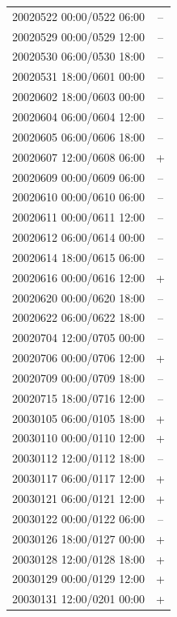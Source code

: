 \documentclass[draft]{agujournal2019}
\begin{document}
\begin{center}
\begin{longtable}{lc}
20020522 00:00/0522 06:00 & -- \\
20020529 00:00/0529 12:00 & -- \\
20020530 06:00/0530 18:00 & -- \\
20020531 18:00/0601 00:00 & -- \\
20020602 18:00/0603 00:00 & -- \\
20020604 06:00/0604 12:00 & -- \\
20020605 06:00/0606 18:00 & -- \\
20020607 12:00/0608 06:00 & + \\
20020609 00:00/0609 06:00 & -- \\
20020610 00:00/0610 06:00 & -- \\
20020611 00:00/0611 12:00 & -- \\
20020612 06:00/0614 00:00 & -- \\
20020614 18:00/0615 06:00 & -- \\
20020616 00:00/0616 12:00 & + \\
20020620 00:00/0620 18:00 & -- \\
20020622 06:00/0622 18:00 & -- \\
20020704 12:00/0705 00:00 & -- \\
20020706 00:00/0706 12:00 & + \\
20020709 00:00/0709 18:00 & -- \\
20020715 18:00/0716 12:00 & -- \\
20030105 06:00/0105 18:00 & + \\
20030110 00:00/0110 12:00 & + \\
20030112 12:00/0112 18:00 & -- \\
20030117 06:00/0117 12:00 & + \\
20030121 06:00/0121 12:00 & + \\
20030122 00:00/0122 06:00 & -- \\
20030126 18:00/0127 00:00 & + \\
20030128 12:00/0128 18:00 & + \\
20030129 00:00/0129 12:00 & + \\
20030131 12:00/0201 00:00 & + \\
\hline
\end{longtable}
\end{center}

\pagebreak
\end{document}
